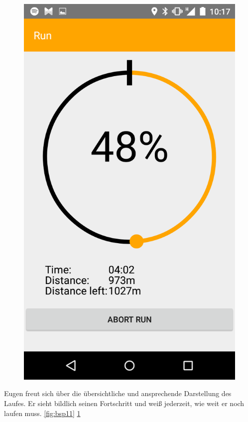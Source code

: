 \begin{figure}[!h]
\begin{minipage}{.4\textwidth}
  \includegraphics[width=.8\linewidth]{abb/bsp/bsp12}
  \label{fig:bsp12}
\end{minipage}
\end{figure}

Eugen freut sich über die übersichtliche und ansprechende Darstellung des Laufes. Er sieht bildlich seinen Fortschritt und weiß jederzeit, wie weit er noch laufen muss. \ref{fig:bsp11} \ref{fig:bsp12}

